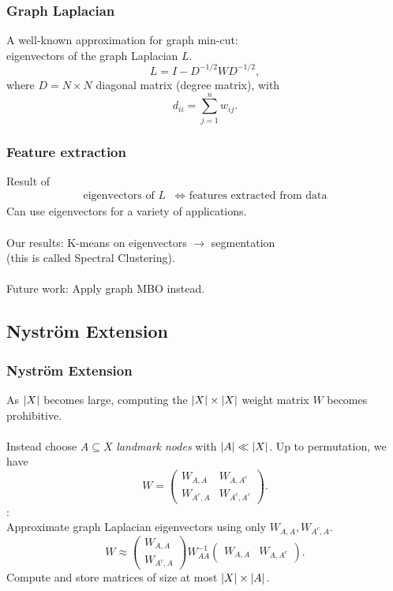 \documentclass{beamer}
\begin{document}
\begin{frame}
  \frametitle{Graph Laplacian}
  A well-known approximation for graph min-cut: \\
  eigenvectors of the graph Laplacian $L$.\\
  \[L = I -D^{-1/2}WD^{-1/2},\]
  where $D = N\times N$ diagonal matrix (degree matrix), with
  \[d_{ii} = \sum_{j=1}^n w_{ij}.\]
\end{frame}

\begin{frame}
  \frametitle{Feature extraction}
  Result of \cite{vonLuxburg07}
  \begin{align*}
    \text{eigenvectors of }L &\iff \text{ features extracted from data}
  \end{align*}
  Can use eigenvectors for a variety of applications. \\~\\
  Our results: K-means on eigenvectors $\to$ segmentation \\
  (this is called Spectral Clustering). \\~\\
  Future work: Apply graph MBO \cite{Merkurjev13} instead.
\end{frame}

\subsection{Nystr\"{o}m Extension}
\begin{frame}
  \frametitle{Nystr\"{o}m Extension}
  As $\left\lvert X\right\rvert$ becomes large, computing the $\left\lvert X\right\rvert\times \left\lvert X\right\rvert$ weight matrix $W$ becomes prohibitive. \\~\\
  Instead choose $A \subseteq X$ \emph{landmark nodes} with $\left\lvert A\right\rvert\ll\left\lvert X\right\rvert$. Up to permutation, we have
  \[  W = \begin{pmatrix} W_{A,A} & W_{A,A^c} \\ W_{A^c,A} & W_{A^c,A^c}
    \end{pmatrix}.\]
  \cite{Fowlkes04}: \\
  Approximate graph Laplacian eigenvectors using only $W_{A,A},W_{A^c,A}$.
  \[  W \approx \begin{pmatrix} W_{A,A} \\ W_{A^c,A} \end{pmatrix}
    W_{AA}^{-1} \begin{pmatrix} W_{A,A} & W_{A,A^c}\end{pmatrix}.\]
  Compute and store matrices of size at most $\left\lvert X\right\rvert\times\left\lvert A\right\rvert$.
\end{frame}
\end{document}
